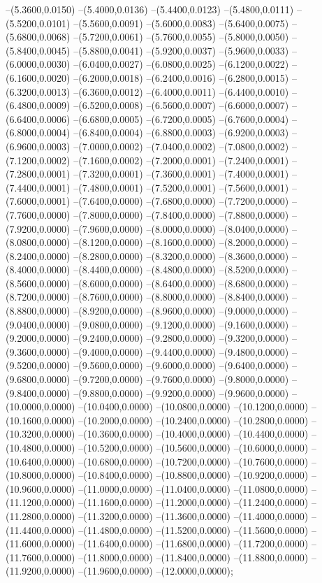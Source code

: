 {	--(5.3600,0.0150)
	--(5.4000,0.0136)
	--(5.4400,0.0123)
	--(5.4800,0.0111)
	--(5.5200,0.0101)
	--(5.5600,0.0091)
	--(5.6000,0.0083)
	--(5.6400,0.0075)
	--(5.6800,0.0068)
	--(5.7200,0.0061)
	--(5.7600,0.0055)
	--(5.8000,0.0050)
	--(5.8400,0.0045)
	--(5.8800,0.0041)
	--(5.9200,0.0037)
	--(5.9600,0.0033)
	--(6.0000,0.0030)
	--(6.0400,0.0027)
	--(6.0800,0.0025)
	--(6.1200,0.0022)
	--(6.1600,0.0020)
	--(6.2000,0.0018)
	--(6.2400,0.0016)
	--(6.2800,0.0015)
	--(6.3200,0.0013)
	--(6.3600,0.0012)
	--(6.4000,0.0011)
	--(6.4400,0.0010)
	--(6.4800,0.0009)
	--(6.5200,0.0008)
	--(6.5600,0.0007)
	--(6.6000,0.0007)
	--(6.6400,0.0006)
	--(6.6800,0.0005)
	--(6.7200,0.0005)
	--(6.7600,0.0004)
	--(6.8000,0.0004)
	--(6.8400,0.0004)
	--(6.8800,0.0003)
	--(6.9200,0.0003)
	--(6.9600,0.0003)
	--(7.0000,0.0002)
	--(7.0400,0.0002)
	--(7.0800,0.0002)
	--(7.1200,0.0002)
	--(7.1600,0.0002)
	--(7.2000,0.0001)
	--(7.2400,0.0001)
	--(7.2800,0.0001)
	--(7.3200,0.0001)
	--(7.3600,0.0001)
	--(7.4000,0.0001)
	--(7.4400,0.0001)
	--(7.4800,0.0001)
	--(7.5200,0.0001)
	--(7.5600,0.0001)
	--(7.6000,0.0001)
	--(7.6400,0.0000)
	--(7.6800,0.0000)
	--(7.7200,0.0000)
	--(7.7600,0.0000)
	--(7.8000,0.0000)
	--(7.8400,0.0000)
	--(7.8800,0.0000)
	--(7.9200,0.0000)
	--(7.9600,0.0000)
	--(8.0000,0.0000)
	--(8.0400,0.0000)
	--(8.0800,0.0000)
	--(8.1200,0.0000)
	--(8.1600,0.0000)
	--(8.2000,0.0000)
	--(8.2400,0.0000)
	--(8.2800,0.0000)
	--(8.3200,0.0000)
	--(8.3600,0.0000)
	--(8.4000,0.0000)
	--(8.4400,0.0000)
	--(8.4800,0.0000)
	--(8.5200,0.0000)
	--(8.5600,0.0000)
	--(8.6000,0.0000)
	--(8.6400,0.0000)
	--(8.6800,0.0000)
	--(8.7200,0.0000)
	--(8.7600,0.0000)
	--(8.8000,0.0000)
	--(8.8400,0.0000)
	--(8.8800,0.0000)
	--(8.9200,0.0000)
	--(8.9600,0.0000)
	--(9.0000,0.0000)
	--(9.0400,0.0000)
	--(9.0800,0.0000)
	--(9.1200,0.0000)
	--(9.1600,0.0000)
	--(9.2000,0.0000)
	--(9.2400,0.0000)
	--(9.2800,0.0000)
	--(9.3200,0.0000)
	--(9.3600,0.0000)
	--(9.4000,0.0000)
	--(9.4400,0.0000)
	--(9.4800,0.0000)
	--(9.5200,0.0000)
	--(9.5600,0.0000)
	--(9.6000,0.0000)
	--(9.6400,0.0000)
	--(9.6800,0.0000)
	--(9.7200,0.0000)
	--(9.7600,0.0000)
	--(9.8000,0.0000)
	--(9.8400,0.0000)
	--(9.8800,0.0000)
	--(9.9200,0.0000)
	--(9.9600,0.0000)
	--(10.0000,0.0000)
	--(10.0400,0.0000)
	--(10.0800,0.0000)
	--(10.1200,0.0000)
	--(10.1600,0.0000)
	--(10.2000,0.0000)
	--(10.2400,0.0000)
	--(10.2800,0.0000)
	--(10.3200,0.0000)
	--(10.3600,0.0000)
	--(10.4000,0.0000)
	--(10.4400,0.0000)
	--(10.4800,0.0000)
	--(10.5200,0.0000)
	--(10.5600,0.0000)
	--(10.6000,0.0000)
	--(10.6400,0.0000)
	--(10.6800,0.0000)
	--(10.7200,0.0000)
	--(10.7600,0.0000)
	--(10.8000,0.0000)
	--(10.8400,0.0000)
	--(10.8800,0.0000)
	--(10.9200,0.0000)
	--(10.9600,0.0000)
	--(11.0000,0.0000)
	--(11.0400,0.0000)
	--(11.0800,0.0000)
	--(11.1200,0.0000)
	--(11.1600,0.0000)
	--(11.2000,0.0000)
	--(11.2400,0.0000)
	--(11.2800,0.0000)
	--(11.3200,0.0000)
	--(11.3600,0.0000)
	--(11.4000,0.0000)
	--(11.4400,0.0000)
	--(11.4800,0.0000)
	--(11.5200,0.0000)
	--(11.5600,0.0000)
	--(11.6000,0.0000)
	--(11.6400,0.0000)
	--(11.6800,0.0000)
	--(11.7200,0.0000)
	--(11.7600,0.0000)
	--(11.8000,0.0000)
	--(11.8400,0.0000)
	--(11.8800,0.0000)
	--(11.9200,0.0000)
	--(11.9600,0.0000)
	--(12.0000,0.0000);
}
